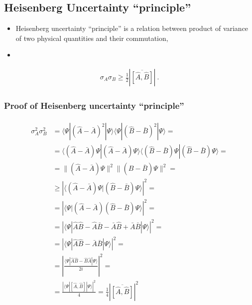 \documentclass[letterpaper,10pt,english]{jupyterBook}
\begin{document}
\subsection{Heisenberg Uncertainty “principle”}
\label{\detokenize{ch/quantum-mechanics/intro:heisenberg-uncertainty-principle}}\begin{itemize}
\item {} 
\sphinxAtStartPar
Heisenberg uncertainty “principle” is a relation between product of variance of two physical quantities and their commutation,

\item {} 
\sphinxAtStartPar
{} 

\end{itemize}
\begin{equation*}
\begin{split}\sigma_A \sigma_B \ge \frac{1}{2} \left|\overline{[\hat{A}, \hat{B}]}\right| \ .\end{split}
\end{equation*}\subsubsection*{Proof of Heisenberg uncertainty “principle”}
\begin{equation*}
\begin{split}\begin{aligned}
 \sigma^2_A \sigma^2_B
 & = \langle \Psi | \left(\hat{A} - \bar{A} \right)^2 | \Psi \rangle\langle \Psi | \left(\hat{B} - \bar{B} \right)^2 | \Psi \rangle = \\
 & = \langle (\hat{A} - \bar{A} ) \Psi |  (\hat{A} - \bar{A} ) \Psi \rangle \langle  (\hat{B} - \bar{B} ) \Psi |  (\hat{B} - \bar{B} ) \Psi \rangle = \\
 & = \| ( \hat{A} - \bar{A} ) \Psi \|^2 \| ( \hat{B} - \bar{B} ) \Psi \|^2 = \\
 & \ge \left| \langle ( \hat{A} - \bar{A} ) \Psi | ( \hat{B} - \bar{B} ) \Psi  \rangle \right|^2 = \\
 & = \left| \langle \Psi | (\hat{A} - \bar{A})(\hat{B} - \bar{B}) \Psi \rangle \right|^2 = \\
 & = \left| \langle \Psi | \hat{A}\hat{B} - \hat{A}\bar{B} - \bar{A}\hat{B} + \bar{A}\bar{B} | \Psi \rangle \right|^2 = \\
 & = \left| \langle \Psi | \hat{A}\hat{B} - \bar{A}\bar{B} | \Psi \rangle \right|^2 = \\
 & = \left| \frac{\langle \Psi | \hat{A}\hat{B} - \hat{B}\hat{A} | \Psi \rangle}{2i} \right|^2 = \\
 & = \frac{ \left|\langle \Psi | [\hat{A}, \hat{B}] | \Psi \rangle \right|^2}{4} = \frac{1}{4} \left| \overline{[\hat{A}, \hat{B}]} \right|^2
\end{aligned}\end{split}
\end{equation*}
\end{document}
